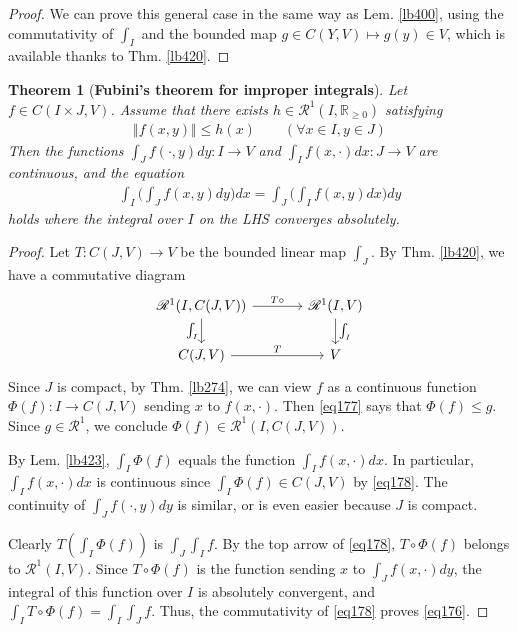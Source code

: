 \documentclass[12pt,b5paper,notitlepage]{article}
\theoremstyle{definition}
\theoremstyle{plain}
\newtheorem{thm}[df]{Theorem}
\newcommand{\scr}{\mathscr}
\newcommand{\Rbb}{\mathbb R}
\numberwithin{equation}{section}
\begin{document}
\begin{proof}
We can prove this general case in the same way as Lem. \ref{lb400}, using the commutativity of $\int_I$ and the bounded map $g\in C(Y,V)\mapsto g(y)\in V$, which is available thanks to Thm. \ref{lb420}.
\end{proof}


\begin{thm}[\textbf{Fubini's theorem for improper integrals}] \label{lb422} 
Let $f\in C(I\times J,V)$. Assume that there exists $h\in\scr R^1(I,\Rbb_{\geq0})$ satisfying
\begin{align}
\Vert f(x,y)\Vert\leq h(x)\qquad(\forall x\in I,y\in J)  \label{eq177}
\end{align}
Then the functions $\int_J f(\cdot,y)dy:I\rightarrow V$ and $\int_If(x,\cdot)dx:J\rightarrow V$ are continuous, and the equation
\begin{align}
\int_I\Big(\int_Jf(x,y)dy\Big)dx=\int_J\Big(\int_I f(x,y)dx\Big)dy \label{eq176}
\end{align}
holds where the integral over $I$ on the LHS converges absolutely.
\end{thm}



\begin{proof}
Let $T:C(J,V)\rightarrow V$ be the bounded linear map $\int_J$. By Thm. \ref{lb420}, we have a commutative diagram
\begin{equation}\label{eq178}
\begin{tikzcd}[column sep=large]
\scr R^1(I,C(J,V)) \arrow[r,"T\circ"] \arrow[d,"\int_I"'] & \scr R^1(I,V) \arrow[d,"\int_I"] \\
C(J,V) \arrow[r,"T"]           & V        
\end{tikzcd} 
\end{equation}
Since $J$ is compact, by Thm. \ref{lb274}, we can view $f$ as a continuous function $\Phi(f):I\rightarrow C(J,V)$ sending $x$ to $f(x,\cdot)$. Then \eqref{eq177} says that $\Phi(f)\leq g$. Since $g\in\scr R^1$, we conclude $\Phi(f)\in\scr R^1(I,C(J,V))$. 

By Lem. \ref{lb423}, $\int_I\Phi(f)$ equals the function $\int_I f(x,\cdot)dx$. In particular, $\int_I f(x,\cdot)dx$ is continuous since $\int_I\Phi(f)\in C(J,V)$ by \eqref{eq178}. The continuity of $\int_J f(\cdot,y)dy$ is similar, or is even easier because $J$ is compact.


Clearly $T(\int_I\Phi(f))$ is $\int_J\int_I f$. By the top arrow of \eqref{eq178}, $T\circ\Phi(f)$ belongs to $\scr R^1(I,V)$. Since $T\circ\Phi(f)$ is the function sending $x$ to $\int_J f(x,\cdot)dy$, the  integral of this function over $I$ is absolutely convergent, and $\int_I T\circ\Phi(f)=\int_I\int_Jf$. Thus, the commutativity of \eqref{eq178} proves \eqref{eq176}. 
\end{proof}
\end{document}
